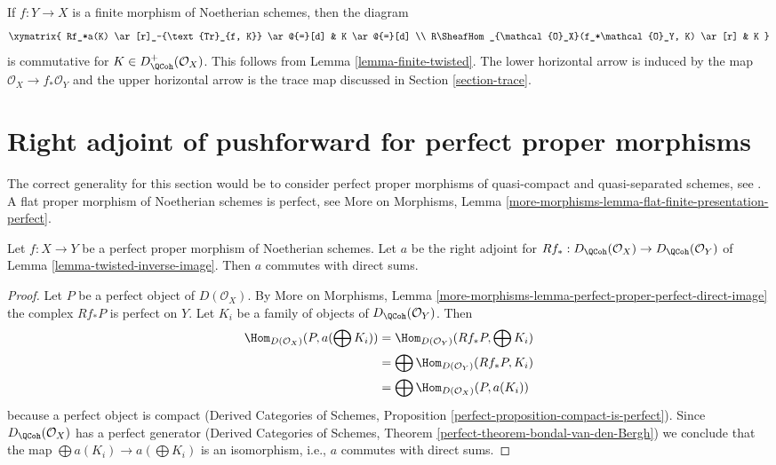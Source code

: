 \begin{remark}
\label{remark-trace-map-finite}
If $f : Y \to X$ is a finite morphism of Noetherian schemes, then the diagram
$$
\xymatrix{
Rf_*a(K) \ar[r]_-{\text{Tr}_{f, K}} \ar@{=}[d] & K \ar@{=}[d] \\
R\SheafHom_{\mathcal{O}_X}(f_*\mathcal{O}_Y, K) \ar[r] & K
}
$$
is commutative for $K \in D_\QCoh^+(\mathcal{O}_X)$. This follows
from Lemma \ref{lemma-finite-twisted}. The lower horizontal
arrow is induced by the map $\mathcal{O}_X \to f_*\mathcal{O}_Y$ and the
upper horizontal arrow is the trace map discussed in
Section \ref{section-trace}.
\end{remark}







\section{Right adjoint of pushforward for perfect proper morphisms}
\label{section-flat-and-proper}

\noindent
The correct generality for this section would be to consider
perfect proper morphisms of quasi-compact and quasi-separated
schemes, see \cite{LN}. A flat proper morphism of Noetherian
schemes is perfect, see
More on Morphisms, Lemma
\ref{more-morphisms-lemma-flat-finite-presentation-perfect}.

\begin{lemma}
\label{lemma-proper-flat-noetherian}
Let $f : X \to Y$ be a perfect proper morphism of Noetherian schemes.
Let $a$ be the right adjoint for
$Rf_* : D_\QCoh(\mathcal{O}_X) \to D_\QCoh(\mathcal{O}_Y)$ of
Lemma \ref{lemma-twisted-inverse-image}. Then $a$ commutes with direct sums.
\end{lemma}

\begin{proof}
Let $P$ be a perfect object of $D(\mathcal{O}_X)$. By
More on Morphisms, Lemma
\ref{more-morphisms-lemma-perfect-proper-perfect-direct-image}
the complex $Rf_*P$ is perfect on $Y$.
Let $K_i$ be a family of objects of $D_\QCoh(\mathcal{O}_Y)$.
Then
\begin{align*}
\Hom_{D(\mathcal{O}_X)}(P, a(\bigoplus K_i))
& =
\Hom_{D(\mathcal{O}_Y)}(Rf_*P, \bigoplus K_i) \\
& =
\bigoplus \Hom_{D(\mathcal{O}_Y)}(Rf_*P, K_i) \\
& =
\bigoplus \Hom_{D(\mathcal{O}_X)}(P, a(K_i))
\end{align*}
because a perfect object is compact (Derived Categories of Schemes,
Proposition \ref{perfect-proposition-compact-is-perfect}).
Since $D_\QCoh(\mathcal{O}_X)$ has a perfect generator
(Derived Categories of Schemes, Theorem
\ref{perfect-theorem-bondal-van-den-Bergh})
we conclude that the map $\bigoplus a(K_i) \to a(\bigoplus K_i)$
is an isomorphism, i.e., $a$ commutes with direct sums.
\end{proof}

